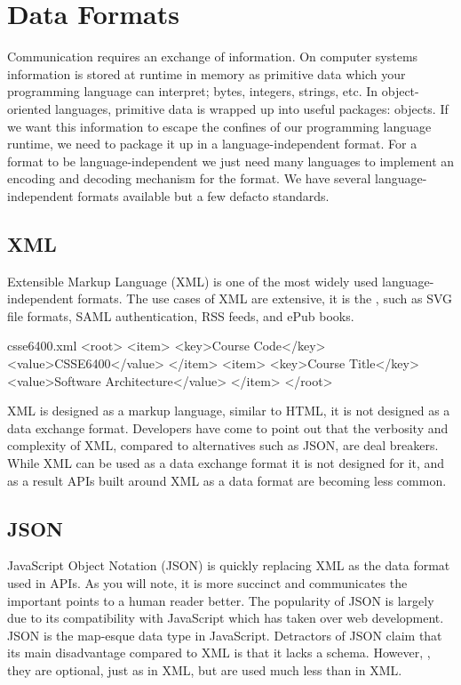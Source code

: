 \documentclass{csse4400}
\begin{document}
\section{Data Formats}
Communication requires an exchange of information.
On computer systems information is stored at runtime in memory as primitive data which your programming language can interpret;
bytes, integers, strings, etc.
In object-oriented languages,
primitive data is wrapped up into useful packages: objects.
If we want this information to escape the confines of our programming language runtime,
we need to package it up in a language-independent format.
For a format to be language-independent we just need many languages to implement an encoding and decoding mechanism for the format.
We have several language-independent formats available but a few defacto standards.

\subsection{XML}
Extensible Markup Language (XML) is one of the most widely used language-independent formats.
The use cases of XML are extensive,
it is the ,
such as SVG file formats, SAML authentication, RSS feeds, and ePub books.

\begin{code}[language=xml]{csse6400.xml}
<root>
  <item>
    <key>Course Code</key>
    <value>CSSE6400</value>
  </item>
  <item>
    <key>Course Title</key>
    <value>Software Architecture</value>
  </item>
</root>
\end{code}

XML is designed as a markup language, similar to HTML,
it is not designed as a data exchange format.
Developers have come to point out that the verbosity and complexity of XML,
compared to alternatives such as JSON, are deal breakers.
While XML can be used as a data exchange format it is not designed for it,
and as a result APIs built around XML as a data format are becoming less common.

\subsection{JSON}
JavaScript Object Notation (JSON) is quickly replacing XML as the data format used in APIs.
As you will note, it is more succinct and communicates the important points to a human reader better.
The popularity of JSON is largely due to its compatibility with JavaScript which has taken over web development.
JSON is the map-esque data type in JavaScript.
Detractors of JSON claim that its main disadvantage compared to XML is that it lacks a schema.
However, ,
they are optional, just as in XML, but are used much less than in XML.
\end{document}
